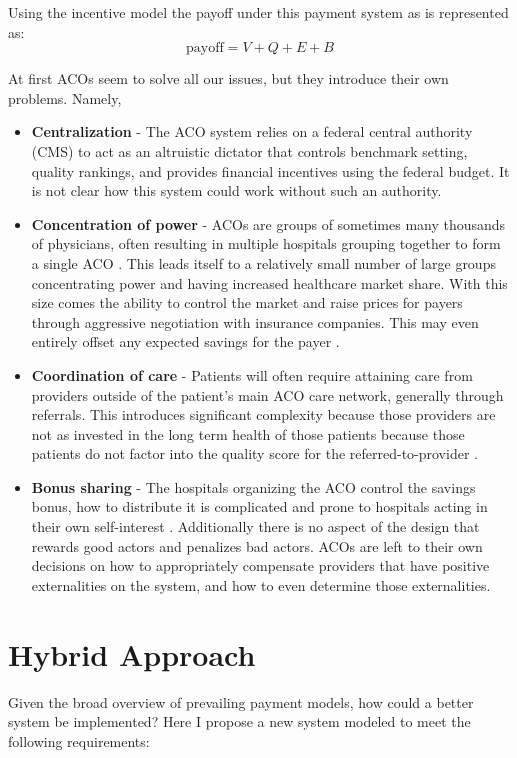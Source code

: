 \documentclass{article}
\begin{document}
Using the incentive model the payoff under this payment system as is represented as:
\begin{equation}
    \text{payoff} = V + Q + E + B
\end{equation}

At first ACOs seem to solve all our issues, but they introduce their own problems. Namely,
\begin{itemize}
    \item \textbf{Centralization} - The ACO system relies on a federal central authority (CMS) to act as an altruistic dictator that controls benchmark setting, quality rankings, and provides financial incentives using the federal budget. It is not clear how this system could work without such an authority.
    \item \textbf{Concentration of power} - ACOs are groups of sometimes many thousands of physicians, often resulting in multiple hospitals grouping together to form a single ACO \cite{acoethics}. This leads itself to a relatively small number of large groups concentrating power and having increased healthcare market share. With this size comes the ability to control the market and raise prices for payers through aggressive negotiation with insurance companies. This may even entirely offset any expected savings for the payer \cite{acoecon}.
    \item \textbf{Coordination of care} - Patients will often require attaining care from providers outside of the patient's main ACO care network, generally through referrals. This introduces significant complexity because those providers are not as invested in the long term health of those patients because those patients do not factor into the quality score for the referred-to-provider \cite{acoecon}.
    \item \textbf{Bonus sharing} - The hospitals organizing the ACO control the savings bonus, how to distribute it is complicated and prone to hospitals acting in their own self-interest \cite{inflation}. Additionally there is no aspect of the design that rewards good actors and penalizes bad actors. ACOs are left to their own decisions on how to appropriately compensate providers that have positive externalities on the system, and how to even determine those externalities.
\end{itemize}

\section{Hybrid Approach}
Given the broad overview of prevailing payment models, how could a better system be implemented? Here I propose a new system modeled to meet the following requirements:
\end{document}
